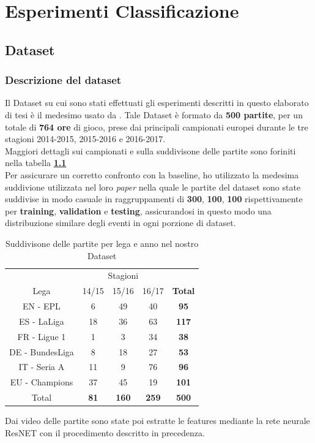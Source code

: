 \chapter{Esperimenti Classificazione}\label{ch:chapter2}
\section{Dataset}
\subsection{Descrizione del dataset }
Il Dataset su cui sono stati effettuati gli esperimenti descritti in questo elaborato di tesi è il medesimo usato da \citet{soccerNet}.
Tale Dataset è formato da \textbf{500 partite}, per un totale di \textbf{764 ore} di gioco, prese dai principali campionati europei durante le tre stagioni 2014-2015, 2015-2016 e 2016-2017.
\\Maggiori dettagli sui campionati e sulla suddivisone delle partite sono foriniti nella tabella \textbf{\ref{table: Dataset}}
\\Per assicurare un corretto confronto con la baseline, ho utilizzato la medesima suddivione utilizzata nel loro \textit{paper} \cite{soccerNet} nella quale le partite del dataset sono state suddivise in modo casuale in raggruppamenti di \textbf{300}, \textbf{100}, \textbf{100} rispettivamente per \textbf{training}, \textbf{validation} e \textbf{testing}, assicurandosi in questo modo una distribuzione similare degli eventi in ogni porzione di dataset.
\begin{table}[H]
\caption{Suddivisone delle partite per lega e anno nel nostro Dataset}
\centering
\begin{tabular}{c| | c|c|c | | c}
\multicolumn{1}{c}{}&\multicolumn{3}{c}{Stagioni}& \\
Lega & 14/15 & 15/16 & 16/17 & \textbf{Total} \\
\hline
EN - EPL & 6 & 49 & 40 & \textbf{95} \\
ES - LaLiga & 18 & 36 & 63 & \textbf{117} \\
FR - Ligue 1 & 1 &  3 & 34 & \textbf{38} \\
DE - BundesLiga & 8 & 18 & 27 & \textbf{53} \\
IT - Seria A & 11 & 9 & 76 & \textbf{96} \\
EU - Champions & 37 & 45 & 19 & \textbf{101} \\
\hline
Total & \textbf{81} & \textbf{160} & \textbf{259} & \textbf{500} \\ [1ex]

\end{tabular}
\label{table: Dataset}
\end{table}
Dai video delle partite sono state poi estratte le features mediante la rete neurale ResNET con il procedimento descritto in precedenza.
